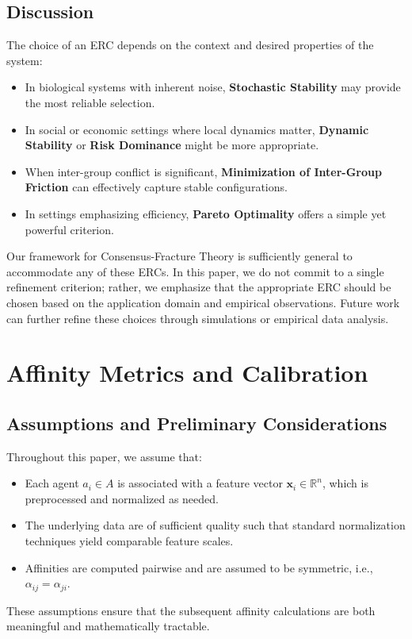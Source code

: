 \documentclass{article}
\begin{document}
\subsection{Discussion}
The choice of an ERC depends on the context and desired properties of the system:
\begin{itemize}
  \item In biological systems with inherent noise, \textbf{Stochastic Stability} may provide the most reliable selection.
  \item In social or economic settings where local dynamics matter, \textbf{Dynamic Stability} or \textbf{Risk Dominance} might be more appropriate.
  \item When inter-group conflict is significant, \textbf{Minimization of Inter-Group Friction} can effectively capture stable configurations.
  \item In settings emphasizing efficiency, \textbf{Pareto Optimality} offers a simple yet powerful criterion.
\end{itemize}
Our framework for Consensus-Fracture Theory is sufficiently general to accommodate any of these ERCs. In this paper, we do not commit to a single refinement criterion; rather, we emphasize that the appropriate ERC should be chosen based on the application domain and empirical observations. Future work can further refine these choices through simulations or empirical data analysis.







\section{Affinity Metrics and Calibration}

\subsection{Assumptions and Preliminary Considerations}
Throughout this paper, we assume that:
\begin{itemize}
  \item Each agent $a_i \in A$ is associated with a feature vector $\mathbf{x}_i \in \mathbb{R}^n$, which is preprocessed and normalized as needed.
  \item The underlying data are of sufficient quality such that standard normalization techniques yield comparable feature scales.
  \item Affinities are computed pairwise and are assumed to be symmetric, i.e., $\alpha_{ij} = \alpha_{ji}$.
\end{itemize}
These assumptions ensure that the subsequent affinity calculations are both meaningful and mathematically tractable.
\end{document}
